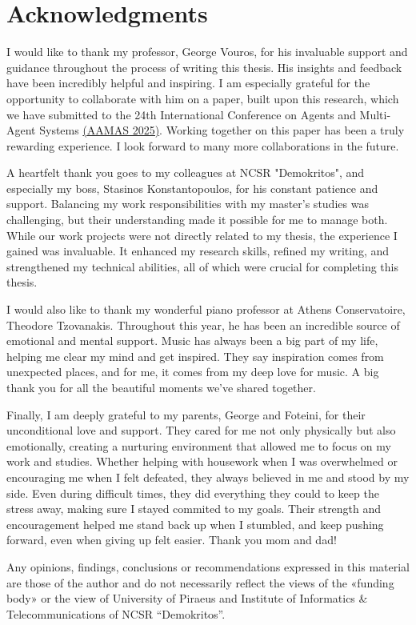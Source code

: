 \section*{Acknowledgments}

I would like to thank my professor, George Vouros, for his invaluable support and guidance throughout the process of writing this thesis. His insights and feedback have been incredibly helpful and inspiring. I am especially grateful for the opportunity to collaborate with him on a paper, built upon this research, which we have submitted to the 24th International Conference on Agents and Multi-Agent Systems \href{https://aamas2025.org/}{(AAMAS 2025)}. Working together on this paper has been a truly rewarding experience. I look forward to many more collaborations in the future.\tinydouble

\noindent
A heartfelt thank you goes to my colleagues at NCSR "Demokritos", and especially my boss, Stasinos Konstantopoulos, for his constant patience and support. Balancing my work responsibilities with my master’s studies was challenging, but their understanding made it possible for me to manage both. While our work projects were not directly related to my thesis, the experience I gained was invaluable. It enhanced my research skills, refined my writing, and strengthened my technical abilities, all of which were crucial for completing this thesis.\tinydouble

\noindent
I would also like to thank my wonderful piano professor at Athens Conservatoire, Theodore Tzovanakis. Throughout this year, he has been an incredible source of emotional and mental support. Music has always been a big part of my life, helping me clear my mind and get inspired. They say inspiration comes from unexpected places, and for me, it comes from my deep love for music. A big thank you for all the beautiful moments we've shared together.\tinydouble

\noindent
Finally, I am deeply grateful to my parents, George and Foteini, for their unconditional love and support. They cared for me not only physically but also emotionally, creating a nurturing environment that allowed me to focus on my work and studies. Whether helping with housework when I was overwhelmed or encouraging me when I felt defeated, they always believed in me and stood by my side. Even during difficult times, they did everything they could to keep the stress away, making sure I stayed commited to my goals. Their strength and encouragement helped me stand back up when I stumbled, and keep pushing forward, even when giving up felt easier. Thank you mom and dad!\tinydouble

\noindent
Any opinions, findings, conclusions or recommendations expressed in this material are those of the author and do not necessarily reflect the views of the «funding body» or the view of University of Piraeus and Institute of Informatics \& Telecommunications of NCSR “Demokritos”. 
